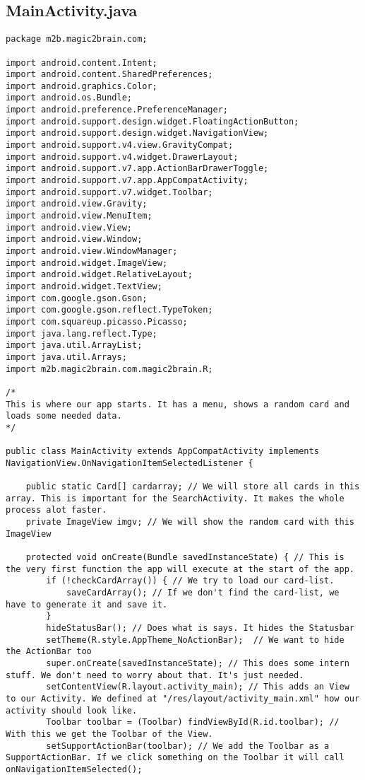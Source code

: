 \subsection{MainActivity.java}
\begin{lstlisting}
package m2b.magic2brain.com;

import android.content.Intent;
import android.content.SharedPreferences;
import android.graphics.Color;
import android.os.Bundle;
import android.preference.PreferenceManager;
import android.support.design.widget.FloatingActionButton;
import android.support.design.widget.NavigationView;
import android.support.v4.view.GravityCompat;
import android.support.v4.widget.DrawerLayout;
import android.support.v7.app.ActionBarDrawerToggle;
import android.support.v7.app.AppCompatActivity;
import android.support.v7.widget.Toolbar;
import android.view.Gravity;
import android.view.MenuItem;
import android.view.View;
import android.view.Window;
import android.view.WindowManager;
import android.widget.ImageView;
import android.widget.RelativeLayout;
import android.widget.TextView;
import com.google.gson.Gson;
import com.google.gson.reflect.TypeToken;
import com.squareup.picasso.Picasso;
import java.lang.reflect.Type;
import java.util.ArrayList;
import java.util.Arrays;
import m2b.magic2brain.com.magic2brain.R;

/*
This is where our app starts. It has a menu, shows a random card and loads some needed data.
*/

public class MainActivity extends AppCompatActivity implements NavigationView.OnNavigationItemSelectedListener {

    public static Card[] cardarray; // We will store all cards in this array. This is important for the SearchActivity. It makes the whole process alot faster.
    private ImageView imgv; // We will show the random card with this ImageView

    protected void onCreate(Bundle savedInstanceState) { // This is the very first function the app will execute at the start of the app.
        if (!checkCardArray()) { // We try to load our card-list.
            saveCardArray(); // If we don't find the card-list, we have to generate it and save it.
        }
        hideStatusBar(); // Does what is says. It hides the Statusbar
        setTheme(R.style.AppTheme_NoActionBar);  // We want to hide the ActionBar too
        super.onCreate(savedInstanceState); // This does some intern stuff. We don't need to worry about that. It's just needed.
        setContentView(R.layout.activity_main); // This adds an View to our Activity. We defined at "/res/layout/activity_main.xml" how our activity should look like.
        Toolbar toolbar = (Toolbar) findViewById(R.id.toolbar); // With this we get the Toolbar of the View.
        setSupportActionBar(toolbar); // We add the Toolbar as a SupportActionBar. If we click something on the Toolbar it will call onNavigationItemSelected();


\end{lstlisting}
